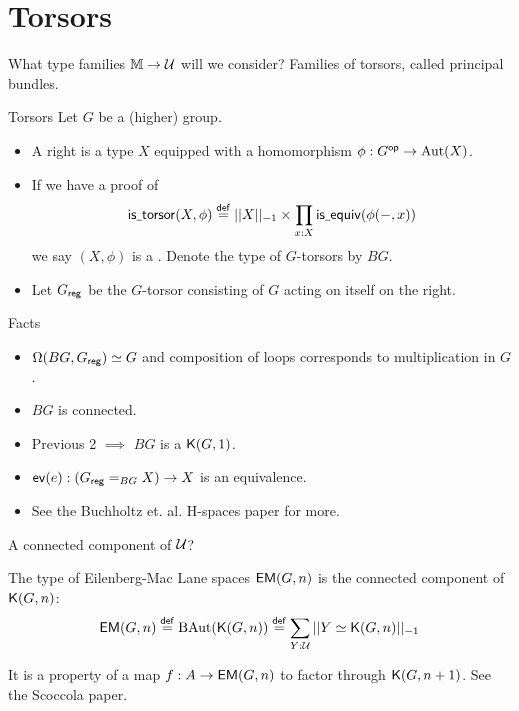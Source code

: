 \section{Torsors}

\begin{frame}
What type families \( \mathbb{M}\to\mathcal{U} \) will we consider? Families of torsors, called \alert{principal bundles}.
\end{frame}

\begin{frame}{Torsors}
Let \( G \) be a (higher) group.
\begin{definition}
\begin{itemize}
\item A right  is a type \( X \) equipped with a homomorphism \( \phi:G^{\mathsf{op}}\to\operatorname{Aut}(X) \).
\item If we have a proof of
\[ 
\mathsf{is\underscore torsor}(X,\phi)\defeq ||X||_{-1}\times \pit{x:X}\mathsf{is\underscore equiv}(\phi(-,x))
\] we say \( (X,\phi) \) is a . Denote the type of \( G \)-torsors by \alert{\( BG \)}.
\item Let \( {G}_{\mathsf{reg}} \) be the \( G \)-torsor consisting of \( G \) acting on itself on the right.
\end{itemize}
\end{definition}
\end{frame}

\begin{frame}{Facts}
\begin{itemize}
\item \( \Omega(BG,{G}_{\mathsf{reg}}) \simeq G \) and composition of loops corresponds to multiplication in \( G \).
\item \( BG \) is connected.
\item Previous 2 \( \implies \) \( BG \) is a \( \mathsf{K}(G,1) \).
\item \( \mathsf{ev}(e):({G}_{\mathsf{reg}}=_{BG} X)\to X \) is an equivalence.
\item See the Buchholtz et. al. H-spaces paper for more.
\end{itemize}
\end{frame}

\begin{frame}{A connected component of \( \mathcal{U} \)?}
\begin{definition}
The \alert{type of Eilenberg-Mac Lane spaces \( \mathsf{EM}(G,n) \)} is the connected component of \( \mathsf{K}(G,n) \):
\[ \mathsf{EM}(G,n)\stackrel{\mathsf{def}}{=} \operatorname{BAut}(\mathsf{K}(G,n))\stackrel{\mathsf{def}}{=} \sum_{Y:\mathcal{U}}||Y\simeq \mathsf{K}(G,n)||_{-1} \]
\end{definition}
It is a property of a map \( f:A\to\mathsf{EM}(G,n) \) to factor through \( \mathsf{K}(G,n+1) \). See the Scoccola paper.
\end{frame}

